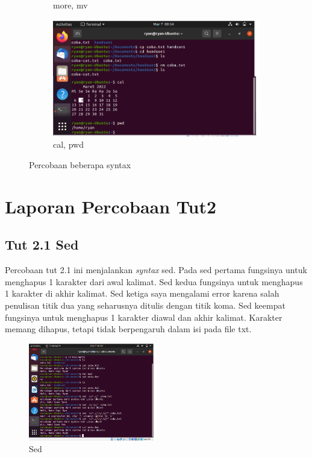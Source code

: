 \documentclass[11pt,a4paper]{article}
\begin{document}
\begin{figure}[h]
\begin{subfigure}[b]{0.4\textwidth}
		\caption{more, mv}
		\label{fig:aug-2}
	\end{subfigure}
	\qquad
	\begin{subfigure}[b]{0.4\textwidth}
		\centering
		\def\svgwidth{\columnwidth}
		\includegraphics[width=1\textwidth]{Gambar/tut 1.4.4 echo-shell.png}
		\caption{cal, pwd}
		\label{fig:aug-2}
	\end{subfigure}
	\caption{Percobaan beberapa syntax}\label{fig:aug}
\end{figure}

\section{Laporan Percobaan Tut2}
\subsection{Tut 2.1 Sed}
    Percobaan tut 2.1 ini menjalankan \textit{syntax} sed. Pada sed pertama fungsinya untuk menghapus 1 karakter dari awal kalimat. Sed kedua fungsinya untuk menghapus 1 karakter di akhir kalimat. Sed ketiga saya mengalami error karena salah penulisan titik dua yang seharusnya ditulis dengan titik koma. Sed keempat fungsinya untuk menghapus 1 karakter diawal dan akhir kalimat. Karakter memang dihapus, tetapi tidak berpengaruh dalam isi pada file txt.
    \begin{figure}[h]
    \centering
    \includegraphics[width=0.5\textwidth]{Gambar/tut 2.1 sed.png}
    \caption{Sed}
    \label{fig:my_label}
    \end{figure}
\end{document}
